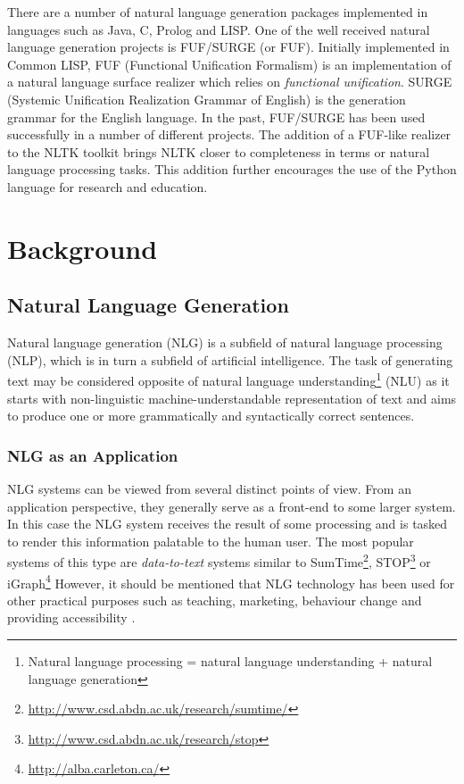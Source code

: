 \documentclass[12pt]{article}
\begin{document}
There are a number of natural language generation packages implemented in languages such as Java, C, Prolog and
LISP. One of the well received natural language generation projects is FUF/SURGE \cite{surge, fuf-man} (or FUF). 
Initially implemented in Common LISP, FUF (Functional Unification Formalism)
is an implementation of a natural language surface realizer which relies on \textit{functional unification}. 
SURGE (Systemic Unification Realization Grammar of English) is the generation grammar for the English language. In the past, FUF/SURGE has been used successfully 
in a number of different projects. The addition of a FUF-like realizer to the NLTK toolkit brings NLTK closer to 
completeness in terms or natural language processing tasks. 
This addition further encourages the use of the Python language for research and education.


\section{Background}

\subsection{Natural Language Generation}
Natural language generation (NLG) is a subfield of natural language processing (NLP),
which is in turn a subfield of artificial intelligence. 
The task of generating text may be considered opposite of natural language
understanding\footnote{Natural language processing = natural language understanding + natural language generation} 
(NLU) as it starts with non-linguistic machine-understandable 
representation of text and aims to produce one or more grammatically and syntactically
correct sentences.

\subsubsection{NLG as an Application}
NLG systems can be viewed from several distinct points of view. From an application
perspective, they generally serve as a front-end to some larger system. In this
case the NLG system receives the result of some processing and is tasked to 
render this information palatable to the human user. The most popular systems
of this type are \textit{data-to-text} systems similar to 
SumTime\footnote{\small \url{http://www.csd.abdn.ac.uk/research/sumtime/}}, 
STOP\footnote{\small \url{http://www.csd.abdn.ac.uk/research/stop}} or 
iGraph\footnote{\small \url{http://alba.carleton.ca/}}
However, it should be mentioned that NLG technology
has been used for other practical purposes such as teaching, marketing, 
behaviour change and providing accessibility \cite{reiter-dale}.
\end{document}
